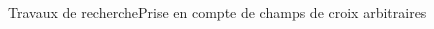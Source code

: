 \documentclass[compress,10pt,aspectratio=169]{beamer}
\begin{document}
\begin{frame}{Travaux de recherche}{Prise en compte de champs de croix arbitraires}
\begin{columns}
\begin{column}{0.33\textwidth}
{        %
        }
        \end{column}
    \end{columns}
\end{frame}
\end{document}
